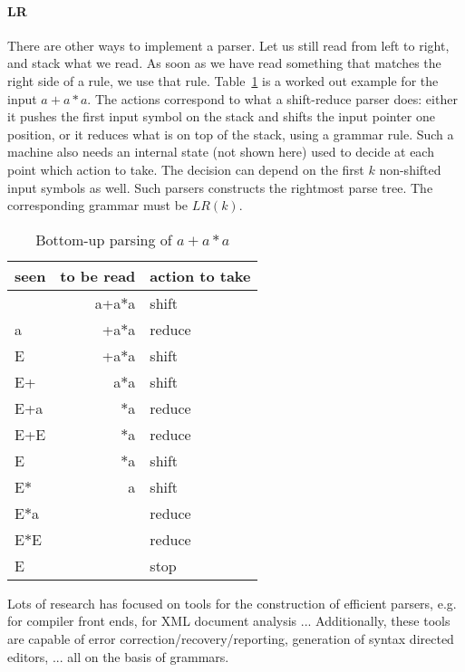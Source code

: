 \paragraph{LR}
There are other ways to implement a parser. Let us still read from
left to right, and stack what we read. As soon as we have read
something that matches the right side of a rule, we use that
rule. Table~\ref{bottomup} is a worked out example for the input $a+a*a$.
The actions correspond to what a shift-reduce parser does: either it
pushes the first input symbol on the stack and shifts the input
pointer one position, or it reduces what is on top of the stack, using
a grammar rule. Such a machine also needs an internal state (not shown
here) used to decide at each point which action to take. The decision
can depend on the first $k$ non-shifted input symbols as well. Such
parsers constructs the rightmost parse tree. The corresponding grammar must
be $LR(k)$.

\begin{table}[ht]
\center
\begin{tabular}{|l|r|l|}
\hline
seen       & to be read      & action to take \\ \hline
           & a+a$*$a           & shift    \\
   a       &  +a$*$a           & reduce   \\
   E       &  +a$*$a           & shift    \\
   E+      &  a$*$a            & shift    \\
   E+a     &   $*$a            & reduce   \\
   E+E     &  $*$a             & reduce   \\
   E       &  $*$a             & shift    \\
   E$*$      &   a             & shift    \\
   E$*$a     &                 & reduce   \\
   E$*$E     &                 & reduce   \\
   E       &                 & stop   \\
\hline
\end{tabular}
\caption{Bottom-up parsing of $a+a*a$} \label{bottomup}
\end{table}

Lots of research has focused on tools for the construction of
efficient parsers, e.g. for compiler front ends, for XML document
analysis ... Additionally, these tools are capable of error
correction/recovery/reporting, generation of syntax directed editors,
...  all on the basis of grammars.




